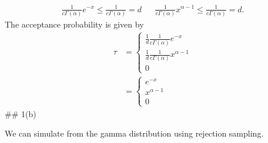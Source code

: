 \documentclass[
]{article}
\begin{document}
\[
\begin{aligned}
\frac{1}{c\Gamma(\alpha)}e^{-x}\le \frac{1}{c\Gamma(\alpha)}=d && \frac{1}{c\Gamma(\alpha)}x^{\alpha -1}\le\frac{1}{c\Gamma(\alpha)}=d.
\end{aligned}
\] The acceptance probability is given by \[
\begin{aligned}
\tau&=\begin{cases}
\frac{1}{d}\frac{1}{c\Gamma(\alpha)}e^{-x}\\
\frac{1}{d}\frac{1}{c\Gamma(\alpha)}x^{\alpha -1}\\
0
\end{cases}\\
&=\begin{cases}
e^{-x}\\
x^{\alpha -1}\\
0
\end{cases}
\end{aligned}
\] \#\# 1(b)

We can simulate from the gamma distribution using rejection sampling.
\end{document}

